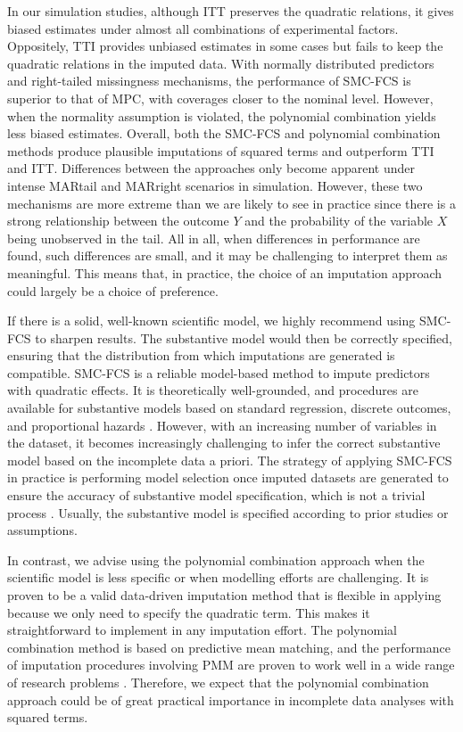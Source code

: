 	
	In our simulation studies, although ITT preserves the quadratic relations, it gives biased estimates under almost all combinations of experimental factors. Oppositely, TTI provides unbiased estimates in some cases but fails to keep the quadratic relations in the imputed data. With normally distributed predictors and right-tailed missingness mechanisms, the performance of SMC-FCS is superior to that of MPC, with coverages closer to the nominal level. However, when the normality assumption is violated, the polynomial combination yields less biased estimates. Overall, both the SMC-FCS and polynomial combination methods produce plausible imputations of squared terms and outperform TTI and ITT. Differences between the approaches only become apparent under intense MARtail and MARright scenarios in simulation. However, these two mechanisms are more extreme than we are likely to see in practice since there is a strong relationship between the outcome $Y$ and the probability of the variable $X$ being unobserved in the tail. All in all, when differences in performance are found, such differences are small, and it may be challenging to interpret them as meaningful. This means that, in practice, the choice of an imputation approach could largely be a choice of preference. 
	
	If there is a solid, well-known scientific model, we highly recommend using SMC-FCS to sharpen results. The substantive model would then be correctly specified, ensuring that the distribution from which imputations are generated is compatible. SMC-FCS is a reliable model-based method to impute predictors with quadratic effects. It is theoretically well-grounded, and procedures are available for substantive models based on standard regression, discrete outcomes, and proportional hazards \citep{Buuren2018}. However, with an increasing number of variables in the dataset, it becomes increasingly challenging to infer the correct substantive model based on the incomplete data a priori. The strategy of applying SMC-FCS in practice is performing model selection once imputed datasets are generated to ensure the accuracy of substantive model specification, which is not a trivial process \citep{bartlett2015multiple}. Usually, the substantive model is specified according to prior studies or assumptions.      
	
	In contrast, we advise using the polynomial combination approach when the scientific model is less specific or when modelling efforts are challenging. It is proven to be a valid data-driven imputation method that is flexible in applying because we only need to specify the quadratic term. This makes it straightforward to implement in any imputation effort. The polynomial combination method is based on predictive mean matching, and the performance of imputation procedures involving PMM are proven to work well in a wide range of research problems \citep{Vink2015, rubin1986statistical, little1988missing}. Therefore, we expect that the polynomial combination approach could be of great practical importance in incomplete data analyses with squared terms.  
	
